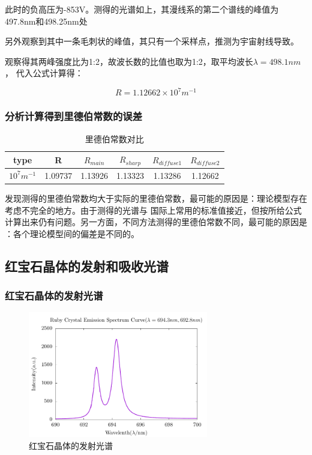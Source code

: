 \documentclass[a4paper,UTF8]{ctexart}
\begin{document}
此时的负高压为-853V。测得的光谱如上，其漫线系的第二个谱线的峰值为497.8nm和498.25nm处

另外观察到其中一条毛刺状的峰值，其只有一个采样点，推测为宇宙射线导致。

观察得其两峰强度比为1:2，故波长数的比值也取为1:2，取平均波长$\lambda = 498.1nm$，
代入公式计算得：

\begin{equation}
    R = 1.12662 \times 10^7 m^{-1}
\end{equation}

\subsubsection{分析计算得到里德伯常数的误差}

\begin{table}[H]
    \centering
    \begin{tabular}{|c|c|c|c|c|c|}
    \hline
        type & R & $R_{main}$ & $R_{sharp}$ & $R_{diffuse1}$ & $R_{diffuse2}$ \\ \hline
        $10^{7} m^{-1}$ & 1.09737 & 1.13926 & 1.13323 & 1.13286 & 1.12662 \\ \hline
    \end{tabular}
    \caption{里德伯常数对比}
\end{table}

发现测得的里德伯常数均大于实际的里德伯常数，最可能的原因是：理论模型存在考虑不完全的地方。由于测得的光谱与
国际上常用的标准值接近，但按所给公式计算出来仍有问题。另一方面，不同方法测得的里德伯常数不同，最可能的原因是
：各个理论模型间的偏差是不同的。

\subsection{红宝石晶体的发射和吸收光谱}

\subsubsection{红宝石晶体的发射光谱}

\begin{figure}[H]
    \centering
    \begin{minipage}[b]{0.9\textwidth}
        \centering
        \includegraphics[width=0.7\textwidth]{./r_1.pdf}
        \caption{红宝石晶体的发射光谱}
    \end{minipage}
\end{figure}
\end{document}
